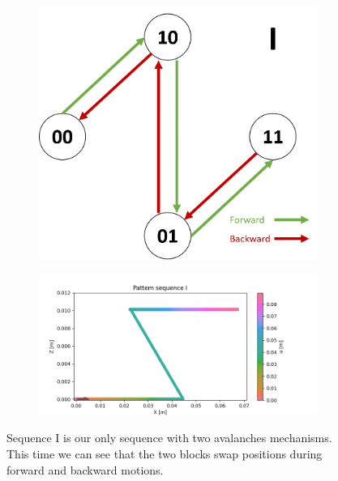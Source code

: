         \begin{figure}[h]
            \centering
            \begin{subfigure}{.2\textwidth}
            \includegraphics[width=\textwidth]{images/S_I.png}
            \end{subfigure}%
            \begin{subfigure}{.6\textwidth}
            \includegraphics[width=\textwidth]{images/I.png}
            \end{subfigure}
            \caption{Sequence I is our only sequence with two avalanches mechanisms. This time we can see that the two blocks swap positions during forward and backward motions.}
        \end{figure}        
        
